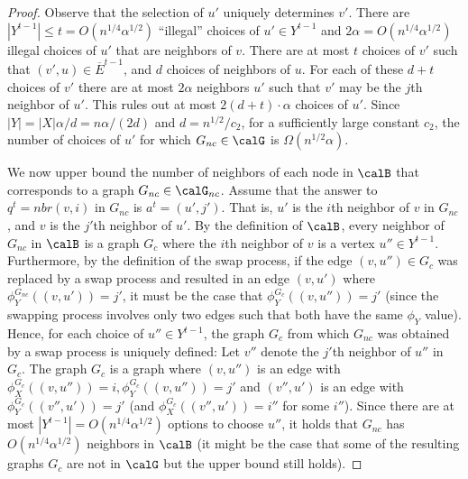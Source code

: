 \begin{proof}
    Observe that the selection of $u'$ uniquely determines $v'$.
    There are $|Y^{t-1}| \leq t = O(n^{1/4}\alpha^{1/2})$ ``illegal'' choices of $u' \in Y^{t-1}$ and $2\alpha = O(n^{1/4}\alpha^{1/2})$ illegal choices of $u'$ that are neighbors of $v$. There are at most $t$ choices of $v'$ such that $(v',u)\in \overline{E}^{t-1}$, and $d$ choices of neighbors of $u$. For each of these $d+t$ choices of $v'$ there are at most $2\alpha$ neighbors $u'$ such that $v'$ may be the $j$th neighbor of $u'$. This rules out at most $2(d+t)\cdot\alpha$ choices of $u'$.
    Since $|Y|=|X|\alpha/d = n\alpha/(2d)$   and $d = n^{1/2}/c_2$, for a sufficiently large constant $c_2$, the number of choices of $u'$ for which $G_{nc} \in \calG$ is $\Omega(n^{1/2}\alpha)$.

    We now upper bound the number of neighbors of each node  in $\calB$ that corresponds to a graph $G_{nc} \in \calG_{nc}$.
    Assume that the answer to $q^t=nbr(v,i)$ in $G_{nc}$ is $a^t=(u',j')$. That is, $u'$ is the $i$th neighbor of $v$ in $G_{nc}$, and $v$ is the $j'$th neighbor of $u'$.
      By the definition of $\calB$, every neighbor of $G_{nc}$ in $\calB$ is a graph $G_{c}$ where the $i$th neighbor of $v$ is a vertex $u''\in Y^{t-1}$. Furthermore, by the definition of the swap process, if the edge $(v,u'')\in G_c$ was replaced by a swap process and resulted in an edge $(v,u')$ where $\phi^{G_{nc}}_Y((v,u'))=j'$, it must be the case that $\phi^{G_c}_{Y}((v,u''))=j'$ (since the swapping process  involves only two edges such that both have the same $\phi_Y$ value). Hence, for each choice of $u''\in Y^{t-1}$, the graph $G_c$ from which $G_{nc}$ was obtained by a swap process is uniquely defined:
      Let $v''$ denote the $j'$th neighbor of $u''$ in $G_c$.
      The graph $G_c$ is a graph where
      $(v,u'')$ is an edge with $\phi^{G_c}_{X}((v,u''))=i, \phi^{G_c}_Y((v,u''))=j'$ and $(v'', u')$ is an edge with $\phi^{G_c}_Y((v'', u'))=j'$ (and $\phi^{G_c}_X((v'', u'))=i''$ for some $i''$). Since there are at most $|Y^{t-1}|=O(n^{1/4}\alpha^{1/2})$ options to choose $u''$, it holds that $G_{nc}$ has $O(n^{1/4}\alpha^{1/2})$ neighbors in $\calB$ (it might be the case that some of the resulting graphs $G_c$ are not in
      $\calG$
      but the upper bound still holds). 


\end{proof}
